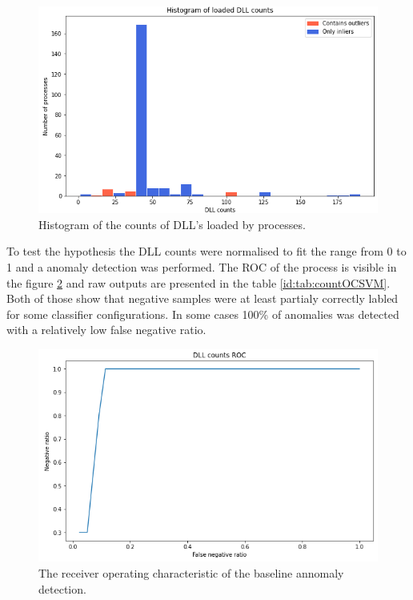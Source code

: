 \documentclass[a4paper,twoside,12pt]{book}
\begin{document}
\begin{figure}
	\centering
	\includegraphics[scale=0.9]{images/DLLcounts}
	\caption{Histogram of the counts of DLL's loaded by processes.}
	\label{fig:dllCounts}
 \end{figure}

To test the hypothesis the DLL counts were normalised to fit the range from 0 to 1 and a anomaly 
detection was performed. The ROC of the process is visible in the figure \ref{fig:DLLcountsROC} and
raw outputs are presented in the table \ref{id:tab:countOCSVM}. Both of those show that 
negative samples were at least partialy correctly labled for some classifier configurations. In 
some cases 100\% of anomalies was detected with a relatively low false negative ratio.

\begin{figure}
	\centering
	\includegraphics{images/DLLCountsROC}
	\caption{The receiver operating characteristic of the baseline annomaly detection.}
	\label{fig:DLLcountsROC}
\end{figure}
\end{document}
